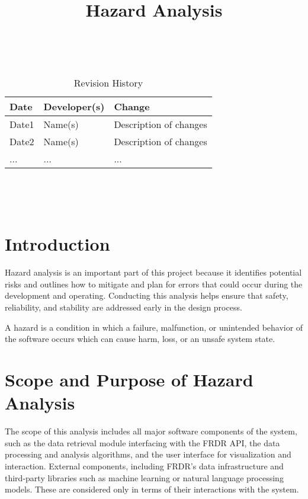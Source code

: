 \documentclass{article}
\title{Hazard Analysis\\\progname}
\author{\authname}
\date{}
\begin{document}
\maketitle
\thispagestyle{empty}

~\newpage


\begin{table}[hp]
\caption{Revision History} \label{TblRevisionHistory}
\begin{tabularx}{\textwidth}{llX}
\toprule
\textbf{Date} & \textbf{Developer(s)} & \textbf{Change}\\
\midrule
Date1 & Name(s) & Description of changes\\
Date2 & Name(s) & Description of changes\\
... & ... & ...\\
\bottomrule
\end{tabularx}
\end{table}

~\newpage

\tableofcontents

~\newpage



\section{Introduction}

Hazard analysis is an important part of this project because it identifies potential risks and outlines how to mitigate and plan for errors that could occur during the development and operating. Conducting this analysis helps ensure that safety, reliability, and stability are addressed early in the design process.

A hazard is a condition in which a failure, malfunction, or unintended behavior of the software occurs which can cause harm, loss, or an unsafe system state.

\section{Scope and Purpose of Hazard Analysis}

The scope of this analysis includes all major software components of the system, such as the data retrieval module interfacing with the FRDR API, the data processing and analysis algorithms, and the user interface for visualization and interaction. External components, including FRDR’s data infrastructure and third-party libraries such as machine learning or natural language processing models. These are considered only in terms of their interactions with the system.
\end{document}
